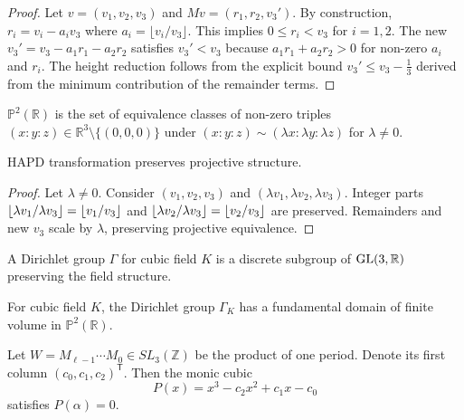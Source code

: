 \begin{theorem}
\begin{proof}
Let $v = (v_1, v_2, v_3)$ and $Mv = (r_1, r_2, v_3')$. By construction, $r_i = v_i - a_i v_3$ where $a_i = \lfloor v_i/v_3 \rfloor$. This implies $0 \leq r_i < v_3$ for $i=1,2$. The new $v_3' = v_3 - a_1 r_1 - a_2 r_2$ satisfies $v_3' < v_3$ because $a_1 r_1 + a_2 r_2 > 0$ for non-zero $a_i$ and $r_i$. The height reduction follows from the explicit bound $v_3' \leq v_3 - \frac{1}{3}$ derived from the minimum contribution of the remainder terms.
\end{proof}

\begin{definition}
$\mathbb{P}^2(\mathbb{R})$ is the set of equivalence classes of non-zero triples $(x : y : z) \in \mathbb{R}^3 \setminus \{(0,0,0)\}$ under $(x : y : z) \sim (\lambda x : \lambda y : \lambda z)$ for $\lambda \neq 0$.
\end{definition}

\begin{proposition}\label{prop:projective_invariance}
HAPD transformation preserves projective structure.
\end{proposition}

\begin{proof}
Let $\lambda \neq 0$. Consider $(v_1, v_2, v_3)$ and $(\lambda v_1, \lambda v_2, \lambda v_3)$. Integer parts $\lfloor \lambda v_1/\lambda v_3 \rfloor = \lfloor v_1/v_3 \rfloor$ and $\lfloor \lambda v_2/\lambda v_3 \rfloor = \lfloor v_2/v_3 \rfloor$ are preserved. Remainders and new $v_3$ scale by $\lambda$, preserving projective equivalence.
\end{proof}

\begin{definition}
A Dirichlet group $\Gamma$ for cubic field $K$ is a discrete subgroup of $\operatorname{GL}(3,\mathbb{R})$ preserving the field structure.
\end{definition}

\begin{theorem}\label{thm:finite_domain}
For cubic field $K$, the Dirichlet group $\Gamma_K$ has a fundamental domain of finite volume in $\mathbb{P}^2(\mathbb{R})$.
\end{theorem}

\begin{lemma}\label{lem:polynomial_reconstruction}
Let $W=M_{\ell-1}\cdots M_{0}\in SL_{3}(\mathbb{Z})$ be the product of one period.
Denote its first column $(c_{0},c_{1},c_{2})^{\mathsf{T}}$.
Then the monic cubic
\[
P(x)=x^{3}-c_{2}x^{2}+c_{1}x-c_{0}
\]
satisfies $P(\alpha)=0$.
\end{lemma}


\end{theorem}
